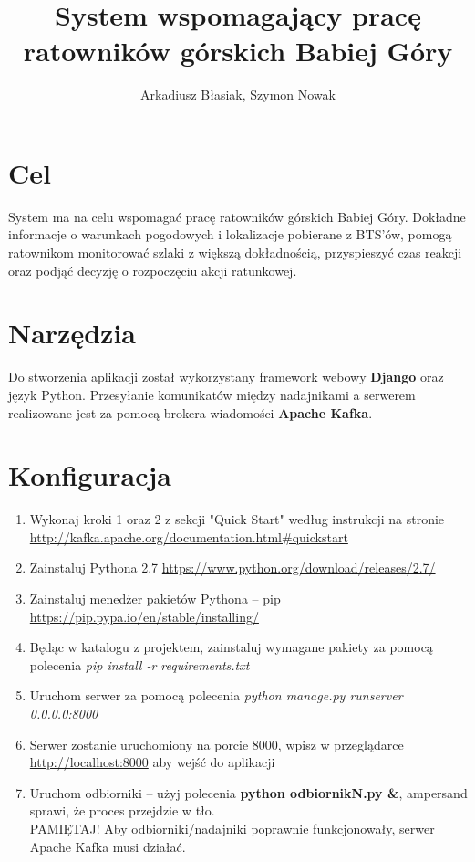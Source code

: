 \documentclass[a4paper,12pt]{article}
\title{System wspomagający pracę ratowników górskich Babiej Góry}
\author{Arkadiusz Błasiak, Szymon Nowak}
\date{}
\begin{document}
\maketitle
\tableofcontents
\newpage
\section{Cel}
System ma na celu wspomagać pracę ratowników górskich Babiej Góry. Dokładne informacje o warunkach pogodowych i lokalizacje pobierane z BTS’ów, pomogą ratownikom monitorować szlaki z większą dokładnością, przyspieszyć czas reakcji oraz podjąć decyzję o rozpoczęciu akcji ratunkowej.
\section{Narzędzia}
Do stworzenia aplikacji został wykorzystany framework webowy \textbf{Django} oraz język Python. Przesyłanie komunikatów między nadajnikami a serwerem realizowane jest za pomocą brokera wiadomości \textbf{Apache Kafka}.
\section{Konfiguracja}
\begin{enumerate}
\item Wykonaj kroki 1 oraz 2 z sekcji "Quick Start" według instrukcji na stronie \url{http://kafka.apache.org/documentation.html#quickstart}
\item Zainstaluj Pythona 2.7 \url{https://www.python.org/download/releases/2.7/}
\item Zainstaluj menedżer pakietów Pythona -- pip \url{https://pip.pypa.io/en/stable/installing/}
\item Będąc w katalogu z projektem, zainstaluj wymagane pakiety za pomocą polecenia \textit{pip install -r requirements.txt}
\item Uruchom serwer za pomocą polecenia \textit{python manage.py runserver 0.0.0.0:8000}
\item Serwer zostanie uruchomiony na porcie 8000, wpisz w przeglądarce \url{http://localhost:8000} aby wejść do aplikacji
\item Uruchom odbiorniki -- użyj polecenia \textbf{python odbiornikN.py &}, ampersand sprawi, że proces przejdzie w tło.\\ PAMIĘTAJ! Aby odbiorniki/nadajniki poprawnie funkcjonowały, serwer Apache Kafka musi działać.
\end{enumerate}
\newpage
\end{document}
